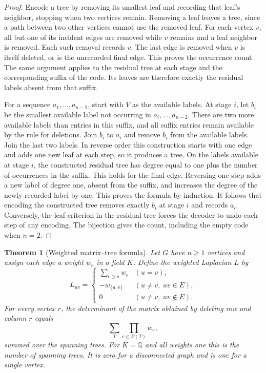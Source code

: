 \documentclass[11pt,oneside,openany]{book}
\theoremstyle{plain}
\newtheorem{theorem}{Theorem}[chapter]
\theoremstyle{definition}
\theoremstyle{remark}
\begin{document}
\begin{proof}
Encode a tree by removing its smallest leaf and recording that leaf's
neighbor, stopping when two vertices remain. Removing a leaf leaves a
tree, since a path between two other vertices cannot use the removed
leaf. For each vertex \(v\), all but one of its incident edges are
removed while \(v\) remains and a leaf neighbor is removed. Each such
removal records \(v\). The last edge is removed when \(v\) is itself
deleted, or is the unrecorded final edge. This proves the occurrence
count. The same argument applies to the residual tree at each stage
and the corresponding suffix of the code. Its leaves are therefore
exactly the residual labels absent from that suffix.

For a sequence \(a_1,\ldots,a_{n-2}\), start with \(V\) as the available
labels. At stage \(i\), let \(b_i\) be the smallest available label
not occurring in \(a_i,\ldots,a_{n-2}\). There are two more available
labels than entries in this suffix, and all suffix entries remain
available by the rule for deletions. Join \(b_i\) to \(a_i\) and remove
\(b_i\) from the available labels. Join the last two labels. In reverse
order this construction starts with one edge and adds one new leaf
at each step, so it produces a tree. On the labels available at stage
\(i\), the constructed residual tree has degree equal to one plus
the number of occurrences in the suffix. This holds for the final
edge. Reversing one step adds a new label of degree one, absent from
the suffix, and increases the degree of the newly recorded label by
one. This proves the formula by induction. It follows that encoding
the constructed tree removes exactly \(b_i\) at stage \(i\) and records
\(a_i\). Conversely, the leaf criterion in the residual tree forces
the decoder to undo each step of any encoding. The bijection gives
the count, including the empty code when \(n=2\).
\end{proof}

\begin{theorem}[Weighted matrix--tree formula]\label{p204:W42}
Let \(G\) have \(n\geq1\) vertices and assign each edge a weight \(w_e\)
in a field \(K\). Define the weighted Laplacian \(L\) by
\[
  L_{uv}=\begin{cases}
    \sum_{e\ni u} w_e & (u=v),\\
    -w_{\{u,v\}} & (u\ne v,\ uv\in E),\\
    0 & (u\ne v,\ uv\notin E).
  \end{cases}
\]
For every vertex \(r\), the determinant of the matrix obtained by
deleting row and column \(r\) equals
\[
   \sum_{T} \prod_{e\in E(T)} w_e ,
\]
summed over the spanning trees. For \(K=\mathbb{Q}\) and all weights one
this is the number of spanning trees. It is zero for a disconnected
graph and is one for a single vertex.
\end{theorem}
\end{document}
